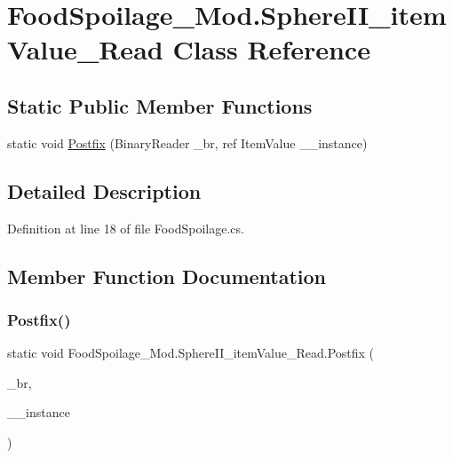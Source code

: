 \hypertarget{class_food_spoilage___mod_1_1_sphere_i_i__item_value___read}{}\section{Food\+Spoilage\+\_\+\+Mod.\+Sphere\+I\+I\+\_\+item\+Value\+\_\+\+Read Class Reference}
\label{class_food_spoilage___mod_1_1_sphere_i_i__item_value___read}
\subsection*{Static Public Member Functions}
\begin{DoxyCompactItemize}
\item 
static void \mbox{\hyperlink{class_food_spoilage___mod_1_1_sphere_i_i__item_value___read_af322a5628b2fd797bee89d01d9229d50}{Postfix}} (Binary\+Reader \+\_\+br, ref Item\+Value \+\_\+\+\_\+instance)
\end{DoxyCompactItemize}


\subsection{Detailed Description}


Definition at line 18 of file Food\+Spoilage.\+cs.



\subsection{Member Function Documentation}
\mbox{\label{class_food_spoilage___mod_1_1_sphere_i_i__item_value___read_af322a5628b2fd797bee89d01d9229d50}} 
\subsubsection{\texorpdfstring{Postfix()}{Postfix()}}
{\footnotesize\ttfamily static void Food\+Spoilage\+\_\+\+Mod.\+Sphere\+I\+I\+\_\+item\+Value\+\_\+\+Read.\+Postfix (\begin{DoxyParamCaption}\item[{Binary\+Reader}]{\+\_\+br,  }\item[{ref Item\+Value}]{\+\_\+\+\_\+instance }\end{DoxyParamCaption})\hspace{0.3cm}{\ttfamily [static]}}



